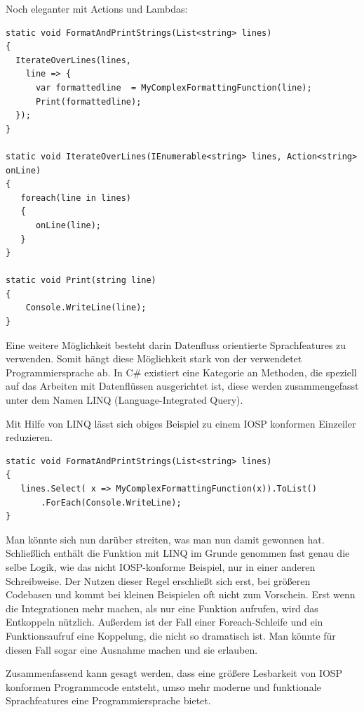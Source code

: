 Noch eleganter mit Actions und Lambdas:
\\
\begin{lstlisting}[caption=FormatAndPrintStrings Variante 3]
static void FormatAndPrintStrings(List<string> lines)
{
  IterateOverLines(lines,
    line => {
      var formattedline  = MyComplexFormattingFunction(line);
      Print(formattedline);
  });
}

static void IterateOverLines(IEnumerable<string> lines, Action<string> onLine)
{
   foreach(line in lines)
   {
      onLine(line);
   }
}

static void Print(string line)
{
    Console.WriteLine(line);
}
\end{lstlisting}


Eine weitere Möglichkeit besteht darin Datenfluss orientierte Sprachfeatures zu verwenden.
Somit hängt diese Möglichkeit stark von der verwendetet Programmiersprache ab.
In C\# existiert eine Kategorie an Methoden, die speziell auf das Arbeiten mit Datenflüssen ausgerichtet ist, diese werden
zusammengefasst unter dem Namen LINQ (Language-Integrated Query).

\bigskip
Mit Hilfe von LINQ lässt sich obiges Beispiel zu einem IOSP konformen Einzeiler reduzieren.
\\
\begin{lstlisting}[caption=FormatAndPrintStrings Variante LINQ]
static void FormatAndPrintStrings(List<string> lines)
{
   lines.Select( x => MyComplexFormattingFunction(x)).ToList()
	   .ForEach(Console.WriteLine);
}
\end{lstlisting}

Man könnte sich nun darüber streiten, was man nun damit gewonnen hat. Schließlich enthält die Funktion mit LINQ im Grunde
genommen fast genau die selbe Logik, wie das nicht IOSP-konforme Beispiel, nur in einer anderen Schreibweise.
Der Nutzen dieser Regel erschließt sich erst, bei größeren Codebasen und kommt bei kleinen Beispielen oft nicht zum Vorschein.
Erst wenn die Integrationen mehr machen, als nur eine Funktion aufrufen, wird das Entkoppeln nützlich.
Außerdem ist der Fall einer Foreach-Schleife und ein Funktionsaufruf eine Koppelung, die nicht so dramatisch ist. Man
könnte für diesen Fall sogar eine Ausnahme machen und sie erlauben.


Zusammenfassend kann gesagt werden, dass eine größere Lesbarkeit von IOSP konformen Programmcode entsteht, umso mehr moderne und funktionale
Sprachfeatures eine Programmiersprache bietet.

